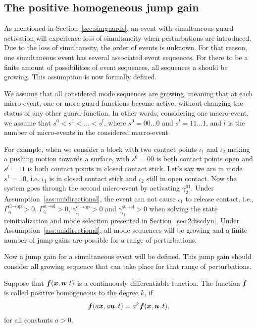 \documentclass[../DC2017114Bouma.tex]{subfiles}
\begin{document}
\subsection{The positive homogeneous jump gain}
As mentioned in Section~\ref{sec:simguards}, an event with simultaneous guard activation will experience loss of simultaneity when perturbations are introduced. Due to the loss of simultaneity, the order of events is unknown. For that reason, one simultaneous event has several associated event sequences. For there to be a finite amount of possibilities of event sequences, all sequences a should be growing. This assumption is now formally defined.

\begin{myass}\label{ass:unidirectional}
We assume that all considered mode sequences are growing, meaning that at each micro-event, one or more guard functions become active, without changing the status of any other guard-function. In other words, considering one macro-event, we assume that $s^0<s^1<...<s^l$, where $s^0= 00...0$ and $s^l = 11...1$, and $l$ is the number of micro-events in the considered macro-event.
\end{myass}

For example, when we consider a block with two contact points $\iota_1$ and $\iota_2$ making a pushing motion towards a surface, with $s^0 = 00$ is both contact points open and $s^l = 11$ is both contact points in closed contact stick. Let's say we are in mode $s^1 = 10$, i.e. $\iota_1$ is in closed contact stick and $\iota_2$ still in open contact. Now the system goes through the second micro-event by activating $\gamma^01_2$. Under Assumption~\ref{ass:unidirectional}, the event can not cause $\iota_1$ to release contact, i.e., $\Gamma_{\iota_1}^{\text{cl}\rightarrow\text{op}}>0$, $\Gamma_{\iota_1}^{\text{st}\rightarrow\text{sl}}>0$, $\gamma_{\iota_1}^{\text{cl}\rightarrow\text{op}}>0$ and $\gamma_{\iota_1}^{\text{st}\rightarrow\text{sl}}>0$ when solving the state reinitialization and mode selection presented in Section~\ref{sec:2discdyn}. Under Assumption~\ref{ass:unidirectional}, all mode sequences will be growing and a finite number of jump gains are possible for a range of perturbations. 

Now a jump gain for a simultaneous event will be defined.  This jump gain should consider all growing sequence that can take place for that range of perturbations.

\begin{mydef}
Suppose that ${\boldsymbol{f}}({\boldsymbol{x}},{\boldsymbol{u}},t)$ is a continuously differentiable function. The function ${\boldsymbol{f}}$ is called positive homogeneous to the degree $k$, if 
\begin{align}
{\boldsymbol{f}}(a{\boldsymbol{x}},a{\boldsymbol{u}},t) = a^k{\boldsymbol{f}}({\boldsymbol{x}},{\boldsymbol{u}},t),
\end{align}
for all constants $a>0$.
\end{mydef}
\end{document}
